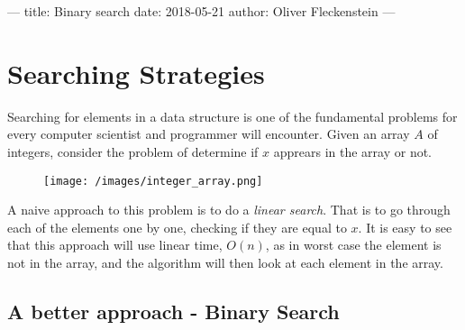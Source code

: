 ---
title: Binary search
date: 2018-05-21
author: Oliver Fleckenstein
---
\section{Searching Strategies}

    Searching for elements in a data structure is one of the fundamental problems for every computer scientist and programmer will encounter.
    Given an array $A$ of integers, consider the problem of determine if $x$ apprears in the array or not.

    \begin{figure}
        \centering
        \texttt{[image: /images/integer\_array.png]}
    \end{figure}

    A naive approach to this problem is to do a \emph{linear search}.
    That is to go through each of the elements one by one, checking if they are equal to $x$.
    It is easy to see that this approach will use linear time, $O(n)$, as in worst case the element is not in the array, and the algorithm will then look at each element in the array.


    \subsection{A better approach - Binary Search}

